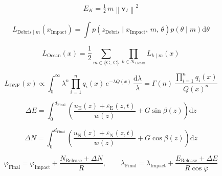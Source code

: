 \begin{equation}
  E_{K} = \tfrac{1}{2}\, m \left\| \mathbf{v}_{I} \right\|^{2}
  \label{eq:18}
\end{equation}

\begin{equation}
  L_{\mathrm{Debris} \mid m}\left(x_{\mathrm{Impact}}\right) = \int p\left(z_{\mathrm{Debris}} \mid x_{\mathrm{Impact}},\, m,\, \theta\right) p\left(\theta \mid m\right) \mathrm{d}\theta
  \label{eq:19}
\end{equation}

\begin{equation}
  L_{\mathrm{Ocean}}\left(x\right) = \frac{1}{2} \sum_{m \in \{\mathrm{G},\, \mathrm{C}\}} \prod_{k \in \mathcal{K}_{\mathrm{Ocean}}} L_{k \mid m}\left(x\right)
  \label{eq:20}
\end{equation}

\begin{equation}
  L_{\mathrm{DNF}}\left(x\right) \propto \int_{0}^{\infty} \lambda^{n} \prod_{i=1}^{n} q_{i}(x)\, e^{-\lambda Q(x)}\, \frac{\mathrm{d}\lambda}{\lambda} = \Gamma(n)\, \frac{\prod_{i=1}^{n} q_{i}(x)}{Q(x)^{n}}
  \label{eq:21}
\end{equation}

\begin{equation}
  \Delta E = \int_{0}^{d_{\mathrm{Final}}} \left(\frac{u_{\mathrm{E}}(z)+\varepsilon_{\mathrm{E}}(z,t)}{w(z)} + G\sin\beta(z)\right)\mathrm{d}z
  \label{eq:22}
\end{equation}

\begin{equation}
  \Delta N = \int_{0}^{d_{\mathrm{Final}}} \left(\frac{u_{\mathrm{N}}(z)+\varepsilon_{\mathrm{N}}(z,t)}{w(z)} + G\cos\beta(z)\right)\mathrm{d}z
  \label{eq:23}
\end{equation}

\begin{equation}
  \varphi_{\mathrm{Final}} = \varphi_{\mathrm{Impact}} + \frac{N_{\mathrm{Release}}+\Delta N}{R}, \qquad \lambda_{\mathrm{Final}} = \lambda_{\mathrm{Impact}} + \frac{E_{\mathrm{Release}}+\Delta E}{R\cos\bar{\varphi}}
  \label{eq:24}
\end{equation}


